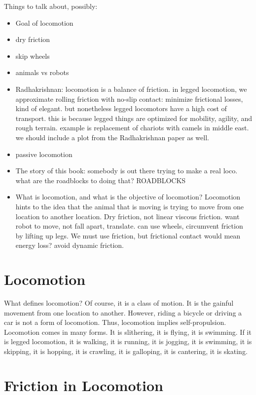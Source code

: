 Things to talk about, possibly:
\begin{itemize}
\item Goal of locomotion
\item dry friction
\item skip wheels
\item animals vs robots
\item Radhakrishnan: locomotion is a balance of friction. in legged locomotion, we approximate rolling friction with no-slip contact: minimize frictional losses, kind of elegant. but nonetheless legged locomotors have a high cost of transport. this is because legged things are optimized for mobility, agility, and rough terrain. example is replacement of chariots with camels in middle east. we should include a plot from the Radhakrishnan paper as well.
\item passive locomotion
\item The story of this book: somebody is out there trying to make a real loco. what are the roadblocks to doing that? ROADBLOCKS
\item What is locomotion, and what is the objective of locomotion? Locomotion hints to the idea that the animal that is moving is trying to move from one location to another location. Dry friction, not linear viscous friction. want robot to move, not fall apart, translate. can use wheels, circumvent friction by lifting up legs. We must use friction, but frictional contact would mean energy loss? avoid dynamic friction.
\end{itemize}

\section{Locomotion}

What defines locomotion? Of course, it is a class of motion. It is the gainful movement from one location to another. However, riding a bicycle or driving a car is not a form of locomotion. Thus, locomotion implies self-propulsion. Locomotion comes in many forms. It is slithering, it is flying, it is swimming. If it is legged locomotion, it is walking, it is running, it is jogging, it is swimming, it is skipping, it is hopping, it is crawling, it is galloping, it is cantering, it is skating.

\section{Friction in Locomotion}

